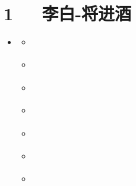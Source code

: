 \documentclass[letterpaper,10pt,english]{sphinxmanual}
\begin{document}
\chapter{1   李白-将进酒}
\label{\detokenize{p01_u6563_u6587/_u674e_u767d-_u5c06_u8fdb_u9152:id1}}\label{\detokenize{p01_u6563_u6587/_u674e_u767d-_u5c06_u8fdb_u9152::doc}}
\begin{sphinxShadowBox}
\begin{itemize}
\item {} 
\label{\detokenize{p01_u6563_u6587/_u674e_u767d-_u5c06_u8fdb_u9152:id10}}{\hyperref[\detokenize{p01_u6563_u6587/_u674e_u767d-_u5c06_u8fdb_u9152:id1}]{}}
\begin{itemize}
\item {} 
\label{\detokenize{p01_u6563_u6587/_u674e_u767d-_u5c06_u8fdb_u9152:id11}}{\hyperref[\detokenize{p01_u6563_u6587/_u674e_u767d-_u5c06_u8fdb_u9152:id3}]{}}

\item {} 
\label{\detokenize{p01_u6563_u6587/_u674e_u767d-_u5c06_u8fdb_u9152:id12}}{\hyperref[\detokenize{p01_u6563_u6587/_u674e_u767d-_u5c06_u8fdb_u9152:id4}]{}}

\item {} 
\label{\detokenize{p01_u6563_u6587/_u674e_u767d-_u5c06_u8fdb_u9152:id13}}{\hyperref[\detokenize{p01_u6563_u6587/_u674e_u767d-_u5c06_u8fdb_u9152:id5}]{}}

\item {} 
\label{\detokenize{p01_u6563_u6587/_u674e_u767d-_u5c06_u8fdb_u9152:id14}}{\hyperref[\detokenize{p01_u6563_u6587/_u674e_u767d-_u5c06_u8fdb_u9152:id6}]{}}

\item {} 
\label{\detokenize{p01_u6563_u6587/_u674e_u767d-_u5c06_u8fdb_u9152:id15}}{\hyperref[\detokenize{p01_u6563_u6587/_u674e_u767d-_u5c06_u8fdb_u9152:id7}]{}}

\item {} 
\label{\detokenize{p01_u6563_u6587/_u674e_u767d-_u5c06_u8fdb_u9152:id16}}{\hyperref[\detokenize{p01_u6563_u6587/_u674e_u767d-_u5c06_u8fdb_u9152:id8}]{}}

\item {} 
\label{\detokenize{p01_u6563_u6587/_u674e_u767d-_u5c06_u8fdb_u9152:id17}}{\hyperref[\detokenize{p01_u6563_u6587/_u674e_u767d-_u5c06_u8fdb_u9152:id9}]{}}

\end{itemize}

\end{itemize}
\end{sphinxShadowBox}
\end{document}
